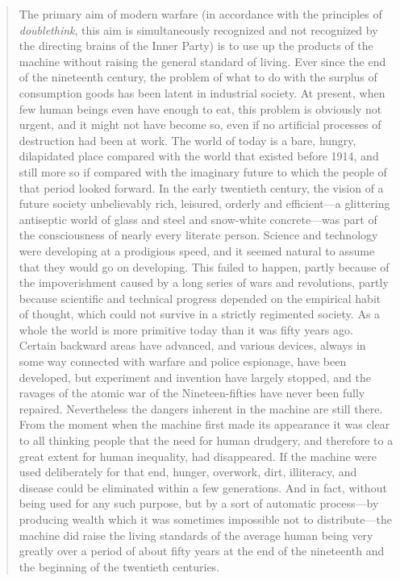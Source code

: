 \begin{quotation}
The primary aim of modern warfare (in accordance with the principles of
\emph{doublethink}, this aim is simultaneously recognized and not
recognized by the directing brains of the Inner Party) is to use up the
products of the machine without raising the general standard of living.
Ever since the end of the nineteenth century, the problem of what to do
with the surplus of consumption goods has been latent in industrial
society. At present, when few human beings even have enough to eat, this
problem is obviously not urgent, and it might not have become so, even
if no artificial processes of destruction had been at work. The world of
today is a bare, hungry, dilapidated place compared with the world that
existed before 1914, and still more so if compared with the imaginary
future to which the people of that period looked forward. In the early
twentieth century, the vision of a future society unbelievably rich,
leisured, orderly and efficient---a glittering antiseptic world of glass
and steel and snow-white concrete---was part of the consciousness of
nearly every literate person. Science and technology were developing at
a prodigious speed, and it seemed natural to assume that they would go
on developing. This failed to happen, partly because of the
impoverishment caused by a long series of wars and revolutions, partly
because scientific and technical progress depended on the empirical
habit of thought, which could not survive in a strictly regimented
society. As a whole the world is more primitive today than it was fifty
years ago. Certain backward areas have advanced, and various devices,
always in some way connected with warfare and police espionage, have
been developed, but experiment and invention have largely stopped, and
the ravages of the atomic war of the Nineteen-fifties have never been
fully repaired. Nevertheless the dangers inherent in the machine are
still there. From the moment when the machine first made its appearance
it was clear to all thinking people that the need for human drudgery,
and therefore to a great extent for human inequality, had disappeared.
If the machine were used deliberately for that end, hunger, overwork,
dirt, illiteracy, and disease could be eliminated within a few
generations. And in fact, without being used for any such purpose, but
by a sort of automatic process---by producing wealth which it was
sometimes impossible not to distribute---the machine did raise the
living standards of the average human being very greatly over a period
of about fifty years at the end of the nineteenth and the beginning of
the twentieth centuries.
\end{quotation}

